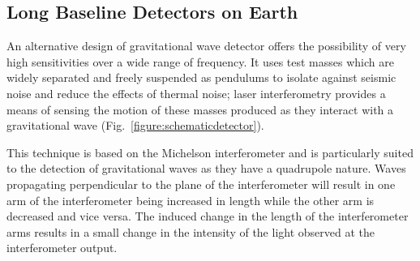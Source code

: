 \documentclass{article}
\begin{document}
\subsection{Long Baseline Detectors on Earth}
\label{subsection:earth}

An alternative design of gravitational wave detector offers the
possibility of very high sensitivities over a wide range of
frequency. It uses test masses which are widely separated and freely
suspended as pendulums to isolate against seismic noise and reduce the
effects of thermal noise; laser interferometry provides a means of
sensing the motion of these masses produced as they interact with a
gravitational wave (Fig.~\ref{figure:schematicdetector}).


This technique is based on the Michelson interferometer and is
particularly suited to the detection of gravitational waves as they
have a quadrupole nature. Waves propagating perpendicular to the plane
of the interferometer will result in one arm of the interferometer
being increased in length while the other arm is decreased and vice
versa. The induced change in the length of the interferometer arms results in
a small change in the intensity of the light observed at the
interferometer output.
\end{document}

